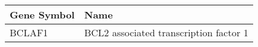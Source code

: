 \begin{tabular}{ll}
\toprule
Gene Symbol &                                   Name \\
\midrule
     BCLAF1 & BCL2 associated transcription factor 1 \\
\bottomrule
\end{tabular}
